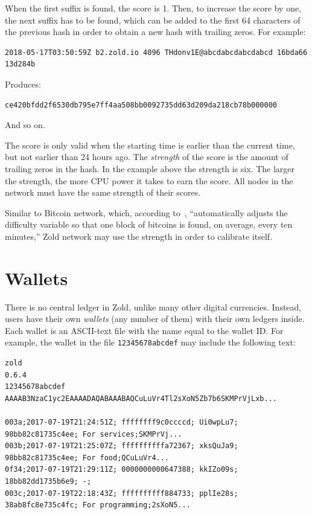 \documentclass[11pt,oneside]{article}
\newcommand\dd[1]{\colorbox{gray!30}{\texttt{#1}}}
\begin{document}
When the first suffix is found, the score is 1. Then, to
increase the score by one, the next suffix has to be found, which
can be added to the first 64 characters of the previous hash
in order to obtain a new hash with trailing zeros. For example:

\begin{verbatim}
2018-05-17T03:50:59Z b2.zold.io 4096 THdonv1E@abcdabcdabcdabcd 16bda66 13d284b
\end{verbatim}

Produces:

\begin{verbatim}
ce420bfdd2f6530db795e7ff4aa508bb0092735dd63d209da218cb78b000000
\end{verbatim}

And so on.

The score is only valid when the starting time is earlier than
the current time, but not earlier than 24 hours ago. The \emph{strength} of the score
is the amount of trailing zeros in the hash. In the example above the
strength is six. The larger the strength, the more CPU power it takes to earn
the score. All nodes in the network must have the same strength of their scores.

Similar to Bitcoin network, which, according to~\textcite{hayes2017},
``automatically adjusts the difficulty
variable so that one block of bitcoins is found, on average, every ten minutes,''
Zold network may use the strength in order to calibrate itself.

\section{Wallets}\label{sec:wallets}

There is no central ledger in Zold, unlike many other digital currencies.
Instead, users have their own \emph{wallets} (any number of them) with their own ledgers inside.
Each wallet is an ASCII-text file with the name equal to the wallet ID.
For example, the wallet in the file \dd{12345678abcdef} may include
the following text:

\begin{verbatim}
zold
0.6.4
12345678abcdef
AAAAB3NzaC1yc2EAAAADAQABAAABAQCuLuVr4Tl2sXoN5Zb7b6SKMPrVjLxb...

003a;2017-07-19T21:24:51Z; ffffffff9c0ccccd; Ui0wpLu7; 98bb82c81735c4ee; For services;SKMPrVj...
003b;2017-07-19T21:25:07Z; ffffffffffa72367; xksQuJa9; 98bb82c81735c4ee; For food;QCuLuVr4...
0f34;2017-07-19T21:29:11Z; 0000000000647388; kkIZo09s; 18bb82dd1735b6e9; -;
003c;2017-07-19T22:18:43Z; ffffffffff884733; pplIe28s; 38ab8fc8e735c4fc; For programming;2sXoN5...
\end{verbatim}
\end{document}
